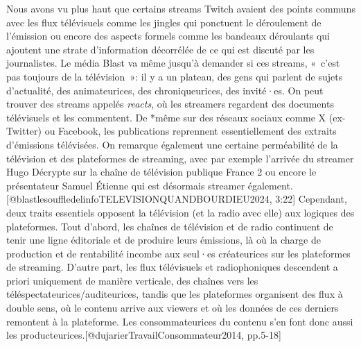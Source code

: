 \documentclass[
]{article}
\begin{document}
Nous avons vu plus haut que certains streams Twitch avaient des points communs avec les flux télévisuels comme les jingles qui ponctuent le déroulement de l'émission ou encore des aspects formels comme les bandeaux déroulants qui ajoutent une strate d'information décorrélée de ce qui est discuté par les journalistes. Le média Blast va même jusqu'à demander si ces streams, «~c'est pas toujours de la télévision~»: il y a un plateau, des gens qui parlent de sujets d'actualité, des animateurices, des chroniqueurices, des invité·es. On peut trouver des streams appelés \emph{reacts}, où les streamers regardent des documents télévisuels et les commentent. De *même sur des réseaux sociaux comme X (ex-Twitter) ou Facebook, les publications reprennent essentiellement des extraits d'émissions télévisées. On remarque également une certaine perméabilité de la télévision et des plateformes de streaming, avec par exemple l'arrivée du streamer Hugo Décrypte sur la chaîne de télévision publique France 2 ou encore le présentateur Samuel Étienne qui est désormais streamer également.{[}@blastlesouffledelinfoTELEVISIONQUANDBOURDIEU2024, 3:22{]} Cependant, deux traits essentiels opposent la télévision (et la radio avec elle) aux logiques des plateformes. Tout d'abord, les chaînes de télévision et de radio continuent de tenir une ligne éditoriale et de produire leurs émissions, là où la charge de production et de rentabilité incombe aux seul·es créateurices sur les plateformes de streaming. D'autre part, les flux télévisuels et radiophoniques descendent a priori uniquement de manière verticale, des chaînes vers les téléspectateurices/auditeurices, tandis que les plateformes organisent des flux à double sens, où le contenu arrive aux viewers et où les données de ces derniers remontent à la plateforme. Les consommateurices du contenu s'en font donc aussi les producteurices.{[}@dujarierTravailConsommateur2014, pp.5-18{]}
\end{document}
